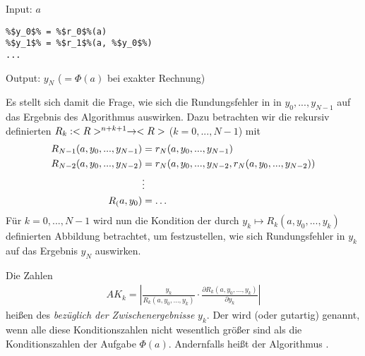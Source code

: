 \begin{algorithm}
	Input: $a$
	\begin{lstlisting}
%$y_0$% = %$r_0$%(a)
%$y_1$% = %$r_1$%(a, %$y_0$%)
...
	\end{lstlisting}
	Output: $y_N$ ($=\Phi(a)$ bei exakter Rechnung)
\end{algorithm}

Es stellt sich damit die Frage, wie sich die Rundungsfehler in in $y_0,...,y_{N-1}$ auf das Ergebnis des Algorithmus auswirken. Dazu betrachten wir die rekursiv definierten  $R_k:<R>^{n+k+1}\to<R>$ ($k=0,...,N-1$) mit
\begin{align}
	R_{N-1}(a,y_0,...,y_{N-1}) &= r_N(a,y_0,...,y_{N-1}) \notag \\
	R_{N-2}(a,y_0,...,y_{N-2}) &= r_N(a,y_0,...,y_{N-2},r_N(a,y_0,...,y_{N-2})) \notag \\
	&\vdots \notag \\
	R_(a,y_0) &= \dots \notag
\end{align}
Für $k=0,...,N-1$ wird nun die Kondition der durch $y_k\mapsto R_k(a,y_0,...,y_k)$ definierten Abbildung betrachtet, um festzustellen, wie sich Rundungsfehler in $y_k$ auf das Ergebnis $y_N$ auswirken.

\begin{definition}
	Die Zahlen
	\begin{align}
		AK_k = \left|\frac{y_k}{R_k(a,y_0,...,y_k)}\cdot\frac{\partial R_k(a,y_0,...,y_k)}{\partial y_k}\right|
	\end{align}
	heißen  des  \emph{bezüglich der Zwischenergebnisse} $y_k$. Der  wird  (oder gutartig) genannt, wenn alle diese Konditionszahlen nicht wesentlich größer sind als die Konditionszahlen der Aufgabe $\Phi(a)$. Andernfalls heißt der Algorithmus .
\end{definition}

